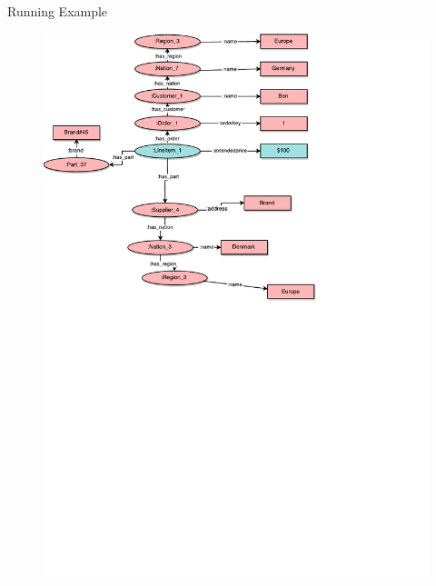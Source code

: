 \begin{frame}{Running Example}
\begin{figure}
    \includegraphics[trim=0 200 0 0,clip,width=\textwidth]{images/dataset_instance_example.pdf}
\end{figure}
\end{frame}

